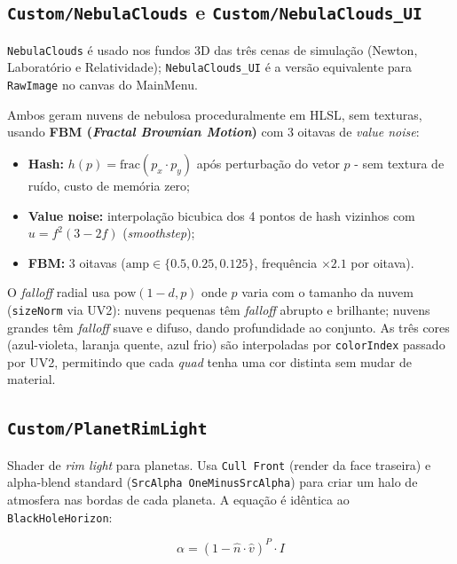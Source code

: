 \documentclass[12pt,a4paper]{article}
\begin{document}
\subsection{\texttt{Custom/NebulaClouds} e \texttt{Custom/NebulaClouds\_UI}}

\texttt{NebulaClouds} \'{e} usado nos fundos 3D das tr\^{e}s cenas de simula\c{c}\~{a}o (Newton, Laborat\'{o}rio e Relatividade); \texttt{NebulaClouds\_UI} \'{e} a vers\~{a}o equivalente para \texttt{RawImage} no canvas do MainMenu.

Ambos geram nuvens de nebulosa proceduralmente em HLSL, sem texturas, usando \textbf{FBM (\textit{Fractal Brownian Motion})} com 3 oitavas de \textit{value noise}:

\begin{itemize}
  \item \textbf{Hash:} $h(p) = \text{frac}\!\left(p_x \cdot p_y\right)$ ap\'{o}s perturba\c{c}\~{a}o do vetor $p$ - sem textura de ru\'{i}do, custo de mem\'{o}ria zero;
  \item \textbf{Value noise:} interpola\c{c}\~{a}o bicubica dos 4 pontos de hash vizinhos com $u = f^2(3 - 2f)$ (\textit{smoothstep});
  \item \textbf{FBM:} 3 oitavas ($\text{amp} \in \{0.5, 0.25, 0.125\}$, frequ\^{e}ncia $\times 2.1$ por oitava).
\end{itemize}

O \textit{falloff} radial usa $\text{pow}(1 - d, p)$ onde $p$ varia com o tamanho da nuvem (\texttt{sizeNorm} via UV2): nuvens pequenas t\^{e}m \textit{falloff} abrupto e brilhante; nuvens grandes t\^{e}m \textit{falloff} suave e difuso, dando profundidade ao conjunto. As tr\^{e}s cores (azul-violeta, laranja quente, azul frio) s\~{a}o interpoladas por \texttt{colorIndex} passado por UV2, permitindo que cada \textit{quad} tenha uma cor distinta sem mudar de material.

\subsection{\texttt{Custom/PlanetRimLight}}

Shader de \textit{rim light} para planetas. Usa \texttt{Cull Front} (render da face traseira) e alpha-blend standard (\texttt{SrcAlpha OneMinusSrcAlpha}) para criar um halo de atmosfera nas bordas de cada planeta. A equa\c{c}\~{a}o \'{e} id\^{e}ntica ao \texttt{BlackHoleHorizon}:

\begin{equation}
\alpha = \left(1 - \hat{n} \cdot \hat{v}\right)^{P} \cdot I
\end{equation}
\end{document}
